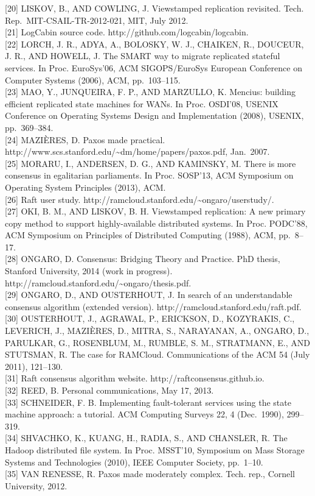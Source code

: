 \documentclass[
]{article}
\begin{document}
{[}20{]} LISKOV, B., AND COWLING, J. Viewstamped replication revisited.
Tech. Rep.~MIT-CSAIL-TR-2012-021, MIT, July 2012.\\
{[}21{]} LogCabin source code. http://github.com/logcabin/logcabin.\\
{[}22{]} LORCH, J. R., ADYA, A., BOLOSKY, W. J., CHAIKEN, R., DOUCEUR,
J. R., AND HOWELL, J. The SMART way to migrate replicated stateful
services. In Proc. EuroSys'06, ACM SIGOPS/EuroSys European Conference on
Computer Systems (2006), ACM, pp.~103--115.\\
{[}23{]} MAO, Y., JUNQUEIRA, F. P., AND MARZULLO, K. Mencius: building
efficient replicated state machines for WANs. In Proc. OSDI'08, USENIX
Conference on Operating Systems Design and Implementation (2008),
USENIX, pp.~369--384.\\
{[}24{]} MAZIÈRES, D. Paxos made practical.
http://www.scs.stanford.edu/\textasciitilde dm/home/papers/paxos.pdf,
Jan.~2007.\\
{[}25{]} MORARU, I., ANDERSEN, D. G., AND KAMINSKY, M. There is more
consensus in egalitarian parliaments. In Proc. SOSP'13, ACM Symposium on
Operating System Principles (2013), ACM.\\
{[}26{]} Raft user study.
http://ramcloud.stanford.edu/\textasciitilde ongaro/userstudy/.\\
{[}27{]} OKI, B. M., AND LISKOV, B. H. Viewstamped replication: A new
primary copy method to support highly-available distributed systems. In
Proc. PODC'88, ACM Symposium on Principles of Distributed Computing
(1988), ACM, pp.~8--17.\\
{[}28{]} ONGARO, D. Consensus: Bridging Theory and Practice. PhD thesis,
Stanford University, 2014 (work in progress).
http://ramcloud.stanford.edu/\textasciitilde ongaro/thesis.pdf.\\
{[}29{]} ONGARO, D., AND OUSTERHOUT, J. In search of an understandable
consensus algorithm (extended version).
http://ramcloud.stanford.edu/raft.pdf.\\
{[}30{]} OUSTERHOUT, J., AGRAWAL, P., ERICKSON, D., KOZYRAKIS, C.,
LEVERICH, J., MAZIÈRES, D., MITRA, S., NARAYANAN, A., ONGARO, D.,
PARULKAR, G., ROSENBLUM, M., RUMBLE, S. M., STRATMANN, E., AND STUTSMAN,
R. The case for RAMCloud. Communications of the ACM 54 (July 2011),
121--130.\\
{[}31{]} Raft consensus algorithm website.
http://raftconsensus.github.io.\\
{[}32{]} REED, B. Personal communications, May 17, 2013.\\
{[}33{]} SCHNEIDER, F. B. Implementing fault-tolerant services using the
state machine approach: a tutorial. ACM Computing Surveys 22, 4
(Dec.~1990), 299--319.\\
{[}34{]} SHVACHKO, K., KUANG, H., RADIA, S., AND CHANSLER, R. The Hadoop
distributed file system. In Proc. MSST'10, Symposium on Mass Storage
Systems and Technologies (2010), IEEE Computer Society, pp.~1--10.\\
{[}35{]} VAN RENESSE, R. Paxos made moderately complex. Tech. rep.,
Cornell University, 2012.
\end{document}
